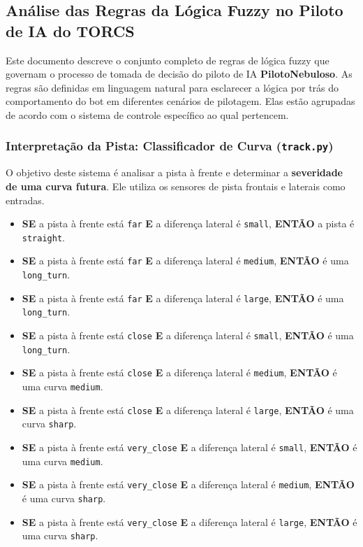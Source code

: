 \documentclass[12pt]{article}
\begin{document}
\subsection{Análise das Regras da Lógica Fuzzy no Piloto de IA do TORCS}
Este documento descreve o conjunto completo de regras de lógica fuzzy que governam o processo de tomada de decisão do piloto de IA \textbf{PilotoNebuloso}. As regras são definidas em linguagem natural para esclarecer a lógica por trás do comportamento do bot em diferentes cenários de pilotagem. Elas estão agrupadas de acordo com o sistema de controle específico ao qual pertencem.

\subsubsection{Interpretação da Pista: Classificador de Curva (\texttt{track.py})}
O objetivo deste sistema é analisar a pista à frente e determinar a \textbf{severidade de uma curva futura}. Ele utiliza os sensores de pista frontais e laterais como entradas.
\begin{itemize}[label=\textbullet, leftmargin=*]
    \item \textbf{SE} a pista à frente está \texttt{far} \textbf{E} a diferença lateral é \texttt{small}, \textbf{ENTÃO} a pista é \texttt{straight}.
    \item \textbf{SE} a pista à frente está \texttt{far} \textbf{E} a diferença lateral é \texttt{medium}, \textbf{ENTÃO} é uma \texttt{long\_turn}.
    \item \textbf{SE} a pista à frente está \texttt{far} \textbf{E} a diferença lateral é \texttt{large}, \textbf{ENTÃO} é uma \texttt{long\_turn}.
    \item \textbf{SE} a pista à frente está \texttt{close} \textbf{E} a diferença lateral é \texttt{small}, \textbf{ENTÃO} é uma \texttt{long\_turn}.
    \item \textbf{SE} a pista à frente está \texttt{close} \textbf{E} a diferença lateral é \texttt{medium}, \textbf{ENTÃO} é uma curva \texttt{medium}.
    \item \textbf{SE} a pista à frente está \texttt{close} \textbf{E} a diferença lateral é \texttt{large}, \textbf{ENTÃO} é uma curva \texttt{sharp}.
    \item \textbf{SE} a pista à frente está \texttt{very\_close} \textbf{E} a diferença lateral é \texttt{small}, \textbf{ENTÃO} é uma curva \texttt{medium}.
    \item \textbf{SE} a pista à frente está \texttt{very\_close} \textbf{E} a diferença lateral é \texttt{medium}, \textbf{ENTÃO} é uma curva \texttt{sharp}.
    \item \textbf{SE} a pista à frente está \texttt{very\_close} \textbf{E} a diferença lateral é \texttt{large}, \textbf{ENTÃO} é uma curva \texttt{sharp}.
\end{itemize}
\end{document}
